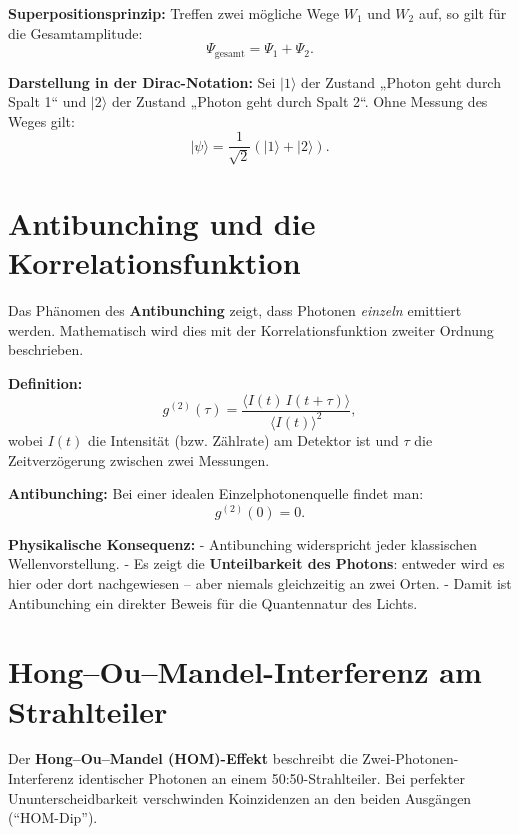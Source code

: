 \textbf{Superpositionsprinzip:}  
Treffen zwei mögliche Wege \( W_1 \) und \( W_2 \) auf, so gilt für die Gesamtamplitude:
\[
\Psi_{\text{gesamt}} = \Psi_{1} + \Psi_{2}.
\]

\textbf{Darstellung in der Dirac-Notation:}  
Sei \(|1\rangle\) der Zustand „Photon geht durch Spalt 1“ und \(|2\rangle\) der Zustand „Photon geht durch Spalt 2“.  
Ohne Messung des Weges gilt:
\[
|\psi\rangle = \frac{1}{\sqrt{2}} \left( |1\rangle + |2\rangle \right).
\]

\section{Antibunching und die Korrelationsfunktion}
\label{anhangA:antibunching}

Das Phänomen des \textbf{Antibunching} zeigt, dass Photonen \emph{einzeln} emittiert werden. 
Mathematisch wird dies mit der Korrelationsfunktion zweiter Ordnung beschrieben.

\textbf{Definition:}
\[
g^{(2)}(\tau) = \frac{\langle I(t) \, I(t+\tau) \rangle}{\langle I(t) \rangle^2},
\]
wobei \( I(t) \) die Intensität (bzw. Zählrate) am Detektor ist und \(\tau\) die Zeitverzögerung zwischen zwei Messungen.

\textbf{Antibunching:}
Bei einer idealen Einzelphotonenquelle findet man:
\[
g^{(2)}(0) = 0.
\]

\textbf{Physikalische Konsequenz:}
- Antibunching widerspricht jeder klassischen Wellenvorstellung.  
- Es zeigt die \textbf{Unteilbarkeit des Photons}: entweder wird es hier oder dort nachgewiesen – aber niemals gleichzeitig an zwei Orten.  
- Damit ist Antibunching ein direkter Beweis für die Quantennatur des Lichts.

\section{Hong--Ou--Mandel-Interferenz\newline
	 am Strahlteiler}
\label{anhangA:HOM}

Der \textbf{Hong--Ou--Mandel (HOM)-Effekt} beschreibt die Zwei-Pho\-tonen-Interferenz identischer Photonen an einem 50:50-Strahlteiler.
Bei perfekter Ununterscheidbarkeit verschwinden Koinzidenzen an den beiden Ausgängen (``HOM-Dip'').

